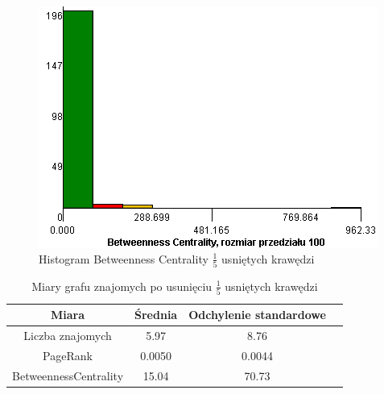 \documentclass[10pt,a4paper]{article}
\begin{document}
\begin{figure}[H]
\centering
\caption{Histogram Betweenness Centrality $\frac{1}{5}$ usniętych krawędzi}
\includegraphics[scale=0.6]{wyniki/final200Friends/1200friendsBCHist.png}
\end{figure}


\begin{table}[H]
  \caption{Miary grafu znajomych po usunięciu  $\frac{1}{5}$ usniętych krawędzi}
  \centering
    \begin{tabular}{cccc}
    \addlinespace
    \toprule
    Miara & Średnia  & Odchylenie standardowe \\
    \midrule
    Liczba znajomych & 5.97 & 8.76 \\
    PageRank & 0.0050 & 0.0044 \\
    BetweennessCentrality & 15.04 & 70.73\\ 
    \bottomrule
    \end{tabular}
  \label{tab:frsum15}
\end{table}
\end{document}

